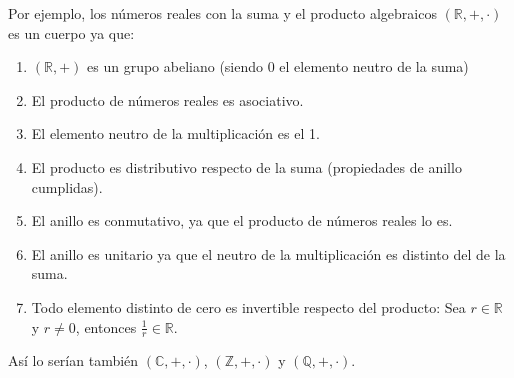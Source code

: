 \documentclass[0_algebra.tex]{subfiles}
\begin{document}
Por ejemplo, los números reales con la suma y el producto algebraicos $(\mathbb{R},+,\cdot)$ es un cuerpo ya que:
\begin{enumerate}
\item $(\mathbb{R}, +)$ es un grupo abeliano (siendo 0 el elemento neutro de la suma)
\item El producto de números reales es asociativo.
\item El elemento neutro de la multiplicación es el 1.
\item El producto es distributivo respecto de la suma (propiedades de anillo cumplidas).
\item El anillo es conmutativo, ya que el producto de números reales lo es.
\item El anillo es unitario ya que el neutro de la multiplicación es distinto del de la suma.
\item Todo elemento distinto de cero es invertible respecto del producto:
Sea $r\in \mathbb{R}$ y $r \neq 0$, entonces $\frac{1}{r} \in \mathbb{R}$.
\end{enumerate}
Así lo serían también $(\mathbb{C},+,\cdot)$, $(\mathbb{Z},+,\cdot)$ y $(\mathbb{Q},+,\cdot)$.
\end{document}
